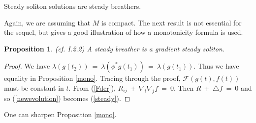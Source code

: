\documentclass[12pt]{amsart}
\numberwithin{equation}{section}
\theoremstyle{plain}
\newtheorem{proposition}[equation]{Proposition}
\theoremstyle{definition}
\theoremstyle{remark}
\begin{document}
Steady soliton solutions are steady breathers. 

Again, we are assuming that $M$ is compact. The next result is not
essential for the sequel, but gives a good illustration of how a
monotonicity formula is used.

\begin{proposition}  (cf. I.2.2) \label{steadybreather}
A steady breather is a gradient steady soliton.
\end{proposition}
\begin{proof}
We have $\lambda(g(t_2)) \: = \: \lambda(\phi^* g(t_1)) \: = \:
\lambda(g(t_1))$. Thus we have equality in Proposition
\ref{mono}. Tracing through the proof, 
${\mathcal F}(g(t), f(t))$ must be constant in $t$. From
(\ref{Fder}), $R_{ij} \: + \: \nabla_i \nabla_j f \: = \: 0$.
Then $R \: + \: \triangle f \: = \: 0$ and so
(\ref{newevolution}) becomes (\ref{steady}). 
\end{proof}

One can sharpen Proposition \ref{mono}.
\end{document}
